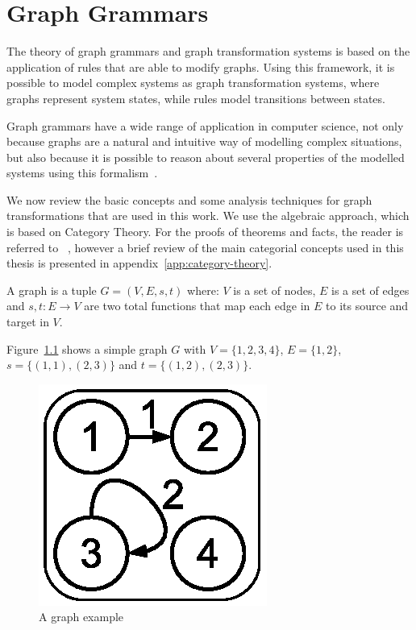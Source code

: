 \chapter{Graph Grammars}\label{ch:gts}

The theory of graph grammars and graph transformation systems is based on the application of rules that are able to modify graphs. Using this framework, it is possible to model complex systems as graph transformation systems, where graphs represent system states, while rules model transitions between states.

Graph grammars have a wide range of application in computer science, not only because graphs are a natural and intuitive way of modelling complex situations, but also because it is possible to reason about several properties of the modelled systems using this formalism~\cite{Ehrig2006,Rozenberg1997}.

  We now review the basic concepts and some analysis techniques for graph transformations that are used in this work. We use the algebraic approach, which is based on Category Theory. For the proofs of theorems and facts, the reader is referred to ~\cite{Corradini1996:DPO}, however a brief review of the main categorial concepts used in this thesis is presented in appendix~\ref{app:category-theory}.

\begin{definition}[Graph] A graph is a tuple $G = \left(V,E,s,t\right)$ where: $V$ is a set of nodes, $E$ is a set of edges and $s,t : E \rightarrow V$ are two total functions that map each edge in $E$ to its source and target in $V$.

\end{definition}

\begin{example}[Graph]\label{def:graph} Figure~\ref{fig:gts:graph} shows a simple graph $G$ with $V = \{1,2,3,4\}$, $E = \{1,2\}$, $s =\{(1,1),(2,3)\}$ and $t = \{(1,2),(2,3)\}$.
\begin{figure}[!ht]
  \centering
  \includegraphics[scale=0.6]{images/gts/graph}
  \caption{A graph example}\label{fig:gts:graph}
\end{figure}
\end{example}

